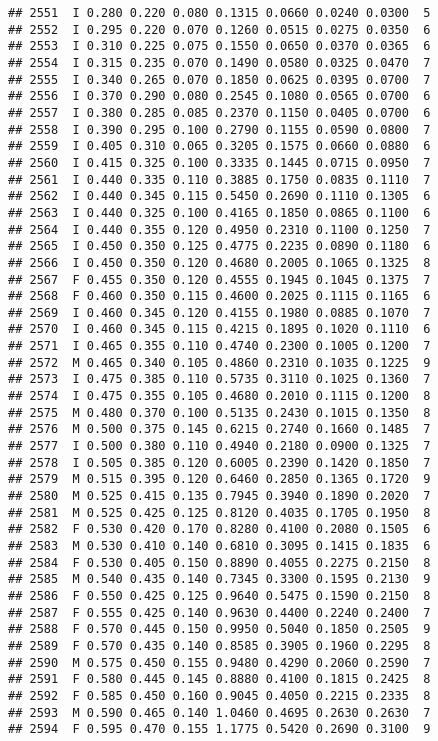 \documentclass[
]{article}
\begin{document}
\begin{verbatim}
## 2551  I 0.280 0.220 0.080 0.1315 0.0660 0.0240 0.0300  5
## 2552  I 0.295 0.220 0.070 0.1260 0.0515 0.0275 0.0350  6
## 2553  I 0.310 0.225 0.075 0.1550 0.0650 0.0370 0.0365  6
## 2554  I 0.315 0.235 0.070 0.1490 0.0580 0.0325 0.0470  7
## 2555  I 0.340 0.265 0.070 0.1850 0.0625 0.0395 0.0700  7
## 2556  I 0.370 0.290 0.080 0.2545 0.1080 0.0565 0.0700  6
## 2557  I 0.380 0.285 0.085 0.2370 0.1150 0.0405 0.0700  6
## 2558  I 0.390 0.295 0.100 0.2790 0.1155 0.0590 0.0800  7
## 2559  I 0.405 0.310 0.065 0.3205 0.1575 0.0660 0.0880  6
## 2560  I 0.415 0.325 0.100 0.3335 0.1445 0.0715 0.0950  7
## 2561  I 0.440 0.335 0.110 0.3885 0.1750 0.0835 0.1110  7
## 2562  I 0.440 0.345 0.115 0.5450 0.2690 0.1110 0.1305  6
## 2563  I 0.440 0.325 0.100 0.4165 0.1850 0.0865 0.1100  6
## 2564  I 0.440 0.355 0.120 0.4950 0.2310 0.1100 0.1250  7
## 2565  I 0.450 0.350 0.125 0.4775 0.2235 0.0890 0.1180  6
## 2566  I 0.450 0.350 0.120 0.4680 0.2005 0.1065 0.1325  8
## 2567  F 0.455 0.350 0.120 0.4555 0.1945 0.1045 0.1375  7
## 2568  F 0.460 0.350 0.115 0.4600 0.2025 0.1115 0.1165  6
## 2569  I 0.460 0.345 0.120 0.4155 0.1980 0.0885 0.1070  7
## 2570  I 0.460 0.345 0.115 0.4215 0.1895 0.1020 0.1110  6
## 2571  I 0.465 0.355 0.110 0.4740 0.2300 0.1005 0.1200  7
## 2572  M 0.465 0.340 0.105 0.4860 0.2310 0.1035 0.1225  9
## 2573  I 0.475 0.385 0.110 0.5735 0.3110 0.1025 0.1360  7
## 2574  I 0.475 0.355 0.105 0.4680 0.2010 0.1115 0.1200  8
## 2575  M 0.480 0.370 0.100 0.5135 0.2430 0.1015 0.1350  8
## 2576  M 0.500 0.375 0.145 0.6215 0.2740 0.1660 0.1485  7
## 2577  I 0.500 0.380 0.110 0.4940 0.2180 0.0900 0.1325  7
## 2578  I 0.505 0.385 0.120 0.6005 0.2390 0.1420 0.1850  7
## 2579  M 0.515 0.395 0.120 0.6460 0.2850 0.1365 0.1720  9
## 2580  M 0.525 0.415 0.135 0.7945 0.3940 0.1890 0.2020  7
## 2581  M 0.525 0.425 0.125 0.8120 0.4035 0.1705 0.1950  8
## 2582  F 0.530 0.420 0.170 0.8280 0.4100 0.2080 0.1505  6
## 2583  M 0.530 0.410 0.140 0.6810 0.3095 0.1415 0.1835  6
## 2584  F 0.530 0.405 0.150 0.8890 0.4055 0.2275 0.2150  8
## 2585  M 0.540 0.435 0.140 0.7345 0.3300 0.1595 0.2130  9
## 2586  F 0.550 0.425 0.125 0.9640 0.5475 0.1590 0.2150  8
## 2587  F 0.555 0.425 0.140 0.9630 0.4400 0.2240 0.2400  7
## 2588  F 0.570 0.445 0.150 0.9950 0.5040 0.1850 0.2505  9
## 2589  F 0.570 0.435 0.140 0.8585 0.3905 0.1960 0.2295  8
## 2590  M 0.575 0.450 0.155 0.9480 0.4290 0.2060 0.2590  7
## 2591  F 0.580 0.445 0.145 0.8880 0.4100 0.1815 0.2425  8
## 2592  F 0.585 0.450 0.160 0.9045 0.4050 0.2215 0.2335  8
## 2593  M 0.590 0.465 0.140 1.0460 0.4695 0.2630 0.2630  7
## 2594  F 0.595 0.470 0.155 1.1775 0.5420 0.2690 0.3100  9

\end{verbatim}
\end{document}
